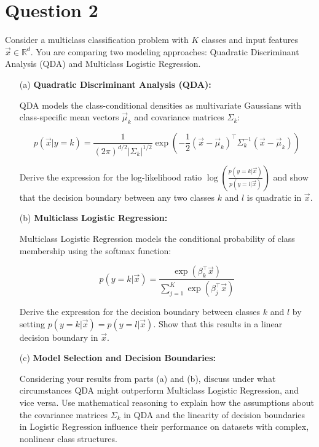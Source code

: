 \documentclass{article}
\begin{document}
\newpage

\section*{Question 2}

Consider a multiclass classification problem with \( K \) classes and input features \( \vec{x} \in \mathbb{R}^d \). You are comparing two modeling approaches: Quadratic Discriminant Analysis (QDA) and Multiclass Logistic Regression.

\begin{enumerate}
    \item[(a)] \textbf{Quadratic Discriminant Analysis (QDA):}
    
    QDA models the class-conditional densities as multivariate Gaussians with class-specific mean vectors \( \vec{\mu}_k \) and covariance matrices \( \Sigma_k \):
    
    \[
    p(\vec{x} | y = k) = \frac{1}{(2\pi)^{d/2} |\Sigma_k|^{1/2}} \exp\left( -\frac{1}{2} (\vec{x} - \vec{\mu}_k)^\top \Sigma_k^{-1} (\vec{x} - \vec{\mu}_k) \right)
    \]
    
    Derive the expression for the log-likelihood ratio \( \log \left( \frac{p(y = k | \vec{x})}{p(y = l | \vec{x})} \right) \) and show that the decision boundary between any two classes \( k \) and \( l \) is quadratic in \( \vec{x} \).
    
    \item[(b)] \textbf{Multiclass Logistic Regression:}
    
    Multiclass Logistic Regression models the conditional probability of class membership using the softmax function:
    
    \[
    p(y = k | \vec{x}) = \frac{\exp(\beta_k^\top \vec{x})}{\sum_{j=1}^K \exp(\beta_j^\top \vec{x})}
    \]
    
    Derive the expression for the decision boundary between classes \( k \) and \( l \) by setting \( p(y = k | \vec{x}) = p(y = l | \vec{x}) \). Show that this results in a linear decision boundary in \( \vec{x} \).
    
    \item[(c)] \textbf{Model Selection and Decision Boundaries:}
    
    Considering your results from parts (a) and (b), discuss under what circumstances QDA might outperform Multiclass Logistic Regression, and vice versa. Use mathematical reasoning to explain how the assumptions about the covariance matrices \( \Sigma_k \) in QDA and the linearity of decision boundaries in Logistic Regression influence their performance on datasets with complex, nonlinear class structures.
\end{enumerate}
\end{document}
